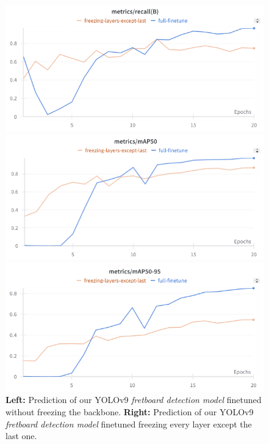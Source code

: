 \documentclass[10pt,twocolumn,letterpaper]{article}
\begin{document}
\begin{figure}[h]
    \begin{minipage}{0.33\textwidth}
        \centering
        \includegraphics[width=\textwidth]{images/interim/metrics-recall-fretboard.png}
    \end{minipage}
    \hfill
    \begin{minipage}{0.33\textwidth}
        \centering
        \includegraphics[width=\textwidth]{images/interim/metrics-mAP50-fretboard.png}
    \end{minipage}
    \hfill
    \begin{minipage}{0.33\textwidth}
        \centering
        \includegraphics[width=\textwidth]{images/interim/metrics-mAP50-95-fretboard.png}
    \end{minipage}
    \caption{\textbf{Left:} Prediction of our YOLOv9 \emph{fretboard detection model} finetuned without freezing the backbone. \textbf{Right:} Prediction of our YOLOv9 \emph{fretboard detection model} finetuned freezing every layer except the last one.}
    \label{fig:metrics-fretboard}
\end{figure}
\end{document}

